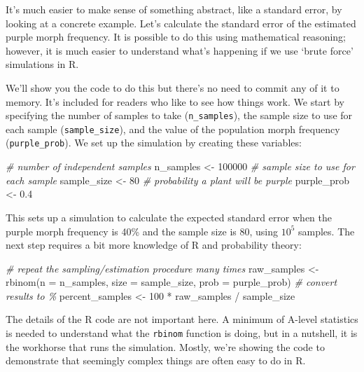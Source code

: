 \documentclass[
]{book}
\newenvironment{Shaded}{\begin{snugshade}}{\end{snugshade}}
\newcommand{\AttributeTok}[1]{\textcolor[rgb]{0.77,0.63,0.00}{#1}}
\newcommand{\CommentTok}[1]{\textcolor[rgb]{0.56,0.35,0.01}{\textit{#1}}}
\newcommand{\DecValTok}[1]{\textcolor[rgb]{0.00,0.00,0.81}{#1}}
\newcommand{\FloatTok}[1]{\textcolor[rgb]{0.00,0.00,0.81}{#1}}
\newcommand{\FunctionTok}[1]{\textcolor[rgb]{0.00,0.00,0.00}{#1}}
\newcommand{\NormalTok}[1]{#1}
\newcommand{\OtherTok}[1]{\textcolor[rgb]{0.56,0.35,0.01}{#1}}
\newcommand{\SpecialCharTok}[1]{\textcolor[rgb]{0.00,0.00,0.00}{#1}}
\begin{document}
It's much easier to make sense of something abstract, like a standard error, by looking at a concrete example. Let's calculate the standard error of the estimated purple morph frequency. It is possible to do this using mathematical reasoning; however, it is much easier to understand what's happening if we use `brute force' simulations in R.

We'll show you the code to do this but there's no need to commit any of it to memory. It's included for readers who like to see how things work. We start by specifying the number of samples to take (\texttt{n\_samples}), the sample size to use for each sample (\texttt{sample\_size}), and the value of the population morph frequency (\texttt{purple\_prob}). We set up the simulation by creating these variables:

\begin{Shaded}
\begin{Highlighting}[]
\CommentTok{\# number of independent samples}
\NormalTok{n\_samples }\OtherTok{\textless{}{-}} \DecValTok{100000}
\CommentTok{\# sample size to use for each sample}
\NormalTok{sample\_size }\OtherTok{\textless{}{-}} \DecValTok{80}
\CommentTok{\# probability a plant will be purple}
\NormalTok{purple\_prob }\OtherTok{\textless{}{-}} \FloatTok{0.4}
\end{Highlighting}
\end{Shaded}

This sets up a simulation to calculate the expected standard error when the purple morph frequency is 40\% and the sample size is 80, using \ensuremath{10^{5}} samples. The next step requires a bit more knowledge of R and probability theory:

\begin{Shaded}
\begin{Highlighting}[]
\CommentTok{\# repeat the sampling/estimation procedure many times}
\NormalTok{raw\_samples }\OtherTok{\textless{}{-}} \FunctionTok{rbinom}\NormalTok{(}\AttributeTok{n =}\NormalTok{ n\_samples, }\AttributeTok{size =}\NormalTok{ sample\_size, }\AttributeTok{prob =}\NormalTok{ purple\_prob)}
\CommentTok{\# convert results to \%}
\NormalTok{percent\_samples }\OtherTok{\textless{}{-}} \DecValTok{100} \SpecialCharTok{*}\NormalTok{ raw\_samples }\SpecialCharTok{/}\NormalTok{ sample\_size}
\end{Highlighting}
\end{Shaded}

The details of the R code are not important here. A minimum of A-level statistics is needed to understand what the \texttt{rbinom} function is doing, but in a nutshell, it is the workhorse that runs the simulation. Mostly, we're showing the code to demonstrate that seemingly complex things are often easy to do in R.
\end{document}
